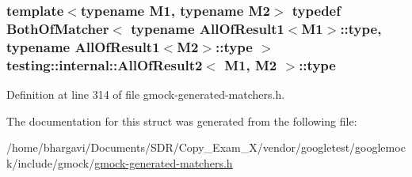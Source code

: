 \subsubsection[{\texorpdfstring{type}{type}}]{\setlength{\rightskip}{0pt plus 5cm}template$<$typename M1, typename M2$>$ typedef {\bf Both\+Of\+Matcher}$<$ typename {\bf All\+Of\+Result1}$<$M1$>$\+::{\bf type}, typename {\bf All\+Of\+Result1}$<$M2$>$\+::{\bf type} $>$ {\bf testing\+::internal\+::\+All\+Of\+Result2}$<$ M1, M2 $>$\+::{\bf type}}\hypertarget{structtesting_1_1internal_1_1_all_of_result2_adec0b0ce2fdd07d398e1fdd2cdb88392}{}\label{structtesting_1_1internal_1_1_all_of_result2_adec0b0ce2fdd07d398e1fdd2cdb88392}


Definition at line 314 of file gmock-\/generated-\/matchers.\+h.



The documentation for this struct was generated from the following file\+:\begin{DoxyCompactItemize}
\item 
/home/bhargavi/\+Documents/\+S\+D\+R/\+Copy\+\_\+\+Exam\+\_\+X/vendor/googletest/googlemock/include/gmock/\hyperlink{gmock-generated-matchers_8h}{gmock-\/generated-\/matchers.\+h}\end{DoxyCompactItemize}
